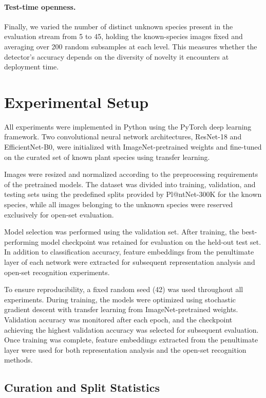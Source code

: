 \documentclass[11pt]{article}
\begin{document}
\paragraph{Test-time openness.} Finally, we varied the number of distinct unknown species present in the evaluation stream from 5 to 45, holding the known-species images fixed and averaging over 200 random subsamples at each level. This measures whether the detector's accuracy depends on the diversity of novelty it encounters at deployment time.

\section{Experimental Setup}

All experiments were implemented in Python using the PyTorch deep learning framework. Two convolutional neural network architectures, ResNet-18 and EfficientNet-B0, were initialized with ImageNet-pretrained weights and fine-tuned on the curated set of known plant species using transfer learning.

Images were resized and normalized according to the preprocessing requirements of the pretrained models. The dataset was divided into training, validation, and testing sets using the predefined splits provided by Pl@ntNet-300K for the known species, while all images belonging to the unknown species were reserved exclusively for open-set evaluation.

Model selection was performed using the validation set. After training, the best-performing model checkpoint was retained for evaluation on the held-out test set. In addition to classification accuracy, feature embeddings from the penultimate layer of each network were extracted for subsequent representation analysis and open-set recognition experiments.

To ensure reproducibility, a fixed random seed (42) was used throughout all experiments. During training, the models were optimized using stochastic gradient descent with transfer learning from ImageNet-pretrained weights. Validation accuracy was monitored after each epoch, and the checkpoint achieving the highest validation accuracy was selected for subsequent evaluation. Once training was complete, feature embeddings extracted from the penultimate layer were used for both representation analysis and the open-set recognition methods.

\subsection{Curation and Split Statistics}
\end{document}
